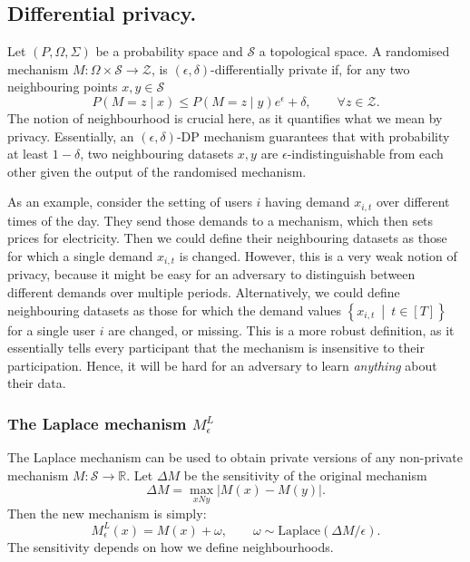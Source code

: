 \documentclass[a4paper,onecolumn]{article}
\numberwithin{algorithm}{section}
\theoremstyle{plain}
\theoremstyle{definition}
\theoremstyle{example}
\newcommand{\CS}{\mathcal{S}}
\newcommand{\CZ}{\mathcal{Z}}
\newcommand{\R}{\mathbb{R}}
\newcommand{\eps}{\epsilon}
\newcommand{\demand}{x}
\newcommand{\nmech}{M}
\newcommand{\sense}{\Delta}
\newcommand{\lmech}{\nmech^{L}_\eps}
\newcommand{\cset}[2] {\left\{#1 ~\middle|~ #2\right\}}
\newcommand{\Laplace}{\textrm{Laplace}}
\begin{document}
\subsection{Differential privacy.}

Let $(P, \Omega, \Sigma)$ be a probability space and $\CS$ a
topological space.  A randomised mechanism
$\nmech : \Omega \times \CS \to \CZ$, is
$(\epsilon, \delta)$-differentially private if, for any two
neighbouring points $x, y \in \CS$
\begin{equation}
  \label{eq:differential-privacy}
  P(\nmech = z \mid x) \leq P(\nmech = z \mid y) e^\epsilon + \delta, \qquad \forall z \in \CZ.
\end{equation}
The notion of neighbourhood is crucial here, as it quantifies what we mean by privacy. Essentially, an $(\epsilon,\delta)$-DP mechanism guarantees that with probability at least $1-\delta$, two neighbouring datasets $x, y$ are $\epsilon$-indistinguishable from each other given the output of the randomised 
mechanism. 


As an example, consider the setting of users $i$ having demand
$\demand_{i,t}$ over different times of the day. They send those
demands to a mechanism, which then sets prices for electricity. Then
we could define their neighbouring datasets as those for which a
single demand $\demand_{i,t}$ is changed. However, this is a very weak
notion of privacy, because it might be easy for an adversary to
distinguish between different demands over multiple
periods. Alternatively, we could define neighbouring datasets as those
for which the demand values $\cset{\demand_{i,t}}{t \in [T]}$ for a
single user $i$ are changed, or missing. This is a more robust
definition, as it essentially tells every participant that the
mechanism is insensitive to their participation. Hence, it will be
hard for an adversary to learn \emph{anything} about their data.



\subsubsection{The Laplace mechanism $\lmech$}

The Laplace mechanism can be used to obtain private versions of any
non-private mechanism $\nmech : \CS \to \R$.
Let $\sense \nmech$ be the sensitivity of the original mechanism 
\[
\sense \nmech = \max_{x N y} |\nmech(x) - \nmech(y)|.
\]
Then the new mechanism is simply:
\[
\lmech(x) = \nmech(x) + \omega, \qquad \omega \sim \Laplace(\sense \nmech / \eps).
\]
The sensitivity depends on how we define neighbourhoods.
\end{document}
